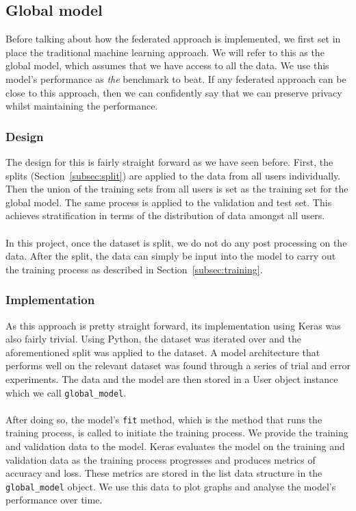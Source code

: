 \documentclass[12pt]{article}
\begin{document}
\subsection{Global model}
Before talking about how the federated approach is implemented, we first set in place the traditional machine learning approach. We will refer to this as the global model, which assumes that we have access to all the data. We use this model's performance as \textit{the} benchmark to beat. If any federated approach can be close to this approach, then we can confidently say that we can preserve privacy whilst maintaining the performance.
\subsubsection{Design}
The design for this is fairly straight forward as we have seen before. First, the splits (Section~\ref{subsec:split}) are applied to the data from all users individually. Then the union of the training sets from all users is set as the training set for the global model. The same process is applied to the validation and test set. This achieves stratification in terms of the distribution of data amongst all users. 
\\\\
In this project, once the dataset is split, we do not do any post processing on the data. After the split, the data can simply be input into the model to carry out the training process as described in Section~\ref{subsec:training}. 
\subsubsection{Implementation}
As this approach is pretty straight forward, its implementation using Keras was also fairly trivial. Using Python, the dataset was iterated over and the aforementioned split was applied to the dataset. A model architecture that performs well on the relevant dataset was found through a series of trial and error experiments. The data and the model are then stored in a User object instance which we call \texttt{global\_model}.
\\\\
After doing so, the model's \texttt{fit} method, which is the method that runs the training process, is called to initiate the training process. We provide the training and validation data to the model. Keras evaluates the model on the training and validation data as the training process progresses and produces metrics of accuracy and loss. These metrics are stored in the list data structure in the \texttt{global\_model} object. We use this data to plot graphs and analyse the model's performance over time.
\end{document}

